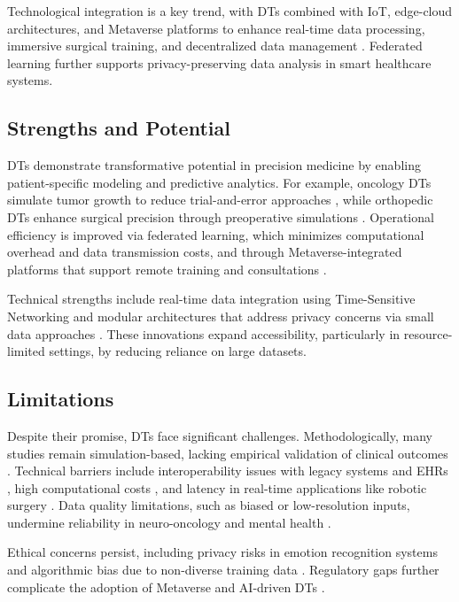 \documentclass[10pt,a4paper]{article}
\begin{document}
Technological integration is a key trend, with DTs combined with IoT, edge-cloud architectures, and Metaverse platforms to enhance real-time data processing, immersive surgical training, and decentralized data management \cite{Siva Sai2024}. Federated learning further supports privacy-preserving data analysis in smart healthcare systems.  

\subsection*{Strengths and Potential}
DTs demonstrate transformative potential in precision medicine by enabling patient-specific modeling and predictive analytics. For example, oncology DTs simulate tumor growth to reduce trial-and-error approaches \cite{Khater2024b}, while orthopedic DTs enhance surgical precision through preoperative simulations \cite{bjelland2022}. Operational efficiency is improved via federated learning, which minimizes computational overhead and data transmission costs, and through Metaverse-integrated platforms that support remote training and consultations \cite{Siva Sai2024}.  

Technical strengths include real-time data integration using Time-Sensitive Networking and modular architectures that address privacy concerns via small data approaches \cite{Venkatesh2024}. These innovations expand accessibility, particularly in resource-limited settings, by reducing reliance on large datasets.  

\subsection*{Limitations}
Despite their promise, DTs face significant challenges. Methodologically, many studies remain simulation-based, lacking empirical validation of clinical outcomes \cite{wu2022, Khater2024b}. Technical barriers include interoperability issues with legacy systems and EHRs \cite{Venkatesh2024}, high computational costs \cite{Siva Sai2024}, and latency in real-time applications like robotic surgery . Data quality limitations, such as biased or low-resolution inputs, undermine reliability in neuro-oncology and mental health \cite{wu2022, Subramanian2022b}.  

Ethical concerns persist, including privacy risks in emotion recognition systems and algorithmic bias due to non-diverse training data \cite{Vidovszky2024, Fekonja2024}. Regulatory gaps further complicate the adoption of Metaverse and AI-driven DTs \cite{Siva Sai2024}.  
\end{document}
